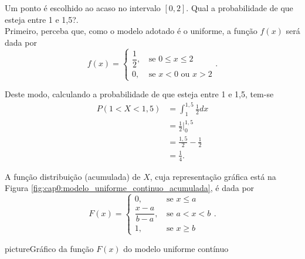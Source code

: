 \documentclass[11pt,fleqn]{book}
\numberwithin{mpicture}{chapter}
\numberwithin{mtable}{chapter}
\numberwithin{mframe}{chapter}
\begin{document}
\begin{example}
	\label{ex:ponto_entre_0_2}
	Um ponto é escolhido ao acaso no intervalo $[0,2]$. Qual a probabilidade de que esteja entre 1 e 1,5?.\\
	
	Primeiro, perceba que, como o modelo adotado é o uniforme, a função $f(x)$ será dada por
	\[
		f(x)=\begin{cases}
			\dfrac{1}{2}\text{,}&\text{ se }0\leqslant x\leqslant 2\\
			0\text{,}&\text{ se } x<0\text{ ou }x>2
		\end{cases}\text{.}
	\]
	
	Deste modo, calculando a probabilidade de que esteja entre 1 e 1,5, tem-se
		\begin{align*}
			P(1<X<1,5)&=\int_{1}^{1,5} \frac{1}{2} dx\\
					  &=\frac{1}{2}\Big|_{0}^{1,5}\\
					  &=\frac{1,5}{2}-\frac{1}{2}\\
					  &=\frac{1}{4}\text{.}
		\end{align*}
\end{example}

A função distribuição (acumulada) de $X$, cuja representação gráfica está na Figura \ref{fig:cap0:modelo_uniforme_continuo_acumulada}, é dada por
\[
	F(x)=\begin{cases}
		0\text{,}&\text{ se }x\leqslant a\\
		\dfrac{x-a}{b-a}\text{,}&\text{ se }a<x<b\\
		1\text{,}&\text{ se }x\geqslant b
	\end{cases}
	\text{.}
\]

\begin{sidepicture}{2cm}{picture}{Gráfico da função $F(x)$ do modelo uniforme contínuo}
	\label{fig:cap0:modelo_uniforme_continuo_acumulada}
\end{sidepicture}
\end{document}
